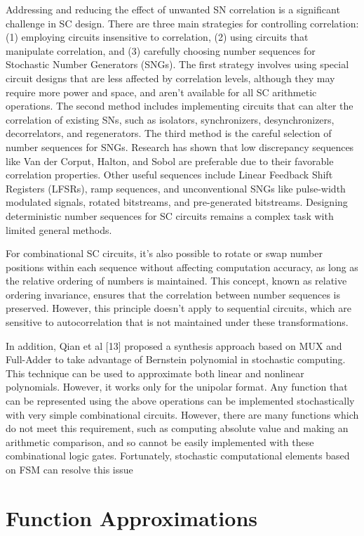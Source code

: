 Addressing and reducing the effect of unwanted SN correlation is a significant challenge in SC design. There are three main strategies for controlling correlation: (1) employing circuits insensitive to correlation, (2) using circuits that manipulate correlation, and (3) carefully choosing number sequences for Stochastic Number Generators (SNGs). The first strategy involves using special circuit designs that are less affected by correlation levels, although they may require more power and space, and aren't available for all SC arithmetic operations. The second method includes implementing circuits that can alter the correlation of existing SNs, such as isolators, synchronizers, desynchronizers, decorrelators, and regenerators. The third method is the careful selection of number sequences for SNGs. Research has shown that low discrepancy sequences like Van der Corput, Halton, and Sobol are preferable due to their favorable correlation properties. Other useful sequences include Linear Feedback Shift Registers (LFSRs), ramp sequences, and unconventional SNGs like pulse-width modulated signals, rotated bitstreams, and pre-generated bitstreams. Designing deterministic number sequences for SC circuits remains a complex task with limited general methods.

For combinational SC circuits, it's also possible to rotate or swap number positions within each sequence without affecting computation accuracy, as long as the relative ordering of numbers is maintained. This concept, known as relative ordering invariance, ensures that the correlation between number sequences is preserved. However, this principle doesn’t apply to sequential circuits, which are sensitive to autocorrelation that is not maintained under these transformations.

In addition, Qian et al [13] proposed a synthesis approach based on MUX and Full-Adder to take advantage of Bernstein polynomial in stochastic computing. This technique can be used to approximate both linear and nonlinear polynomials. However, it works only for the unipolar format. Any function that can be represented using the above operations can be implemented stochastically with very simple combinational circuits. However, there are many functions which do not meet this requirement, such as computing absolute value and making an arithmetic comparison, and so cannot be easily implemented with these combinational logic gates. Fortunately, stochastic computational elements based on FSM can resolve this issue


\section{Function Approximations}
\label{sec:review:sec4}


